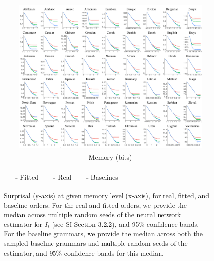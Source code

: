 \begin{figure}
	\begin{tabular}{lc}
	\rotatebox{90}{\ \ \ \ \ \ \ \ \ \ \ \ \ \ \ \ \ \ \ \ \ \ \ \ \ \ \ \ Surprisal (bits)} &
\includegraphics[width=0.95\textwidth]{results-table-mle.pdf}
\\
		&	Memory (bits)
	\end{tabular}

\begin{center}
\begin{tabular}{llll}
\textbf{\textcolor{fitted}{----}} Fitted&
\textbf{\textcolor{real}{----}} Real&
\textbf{\textcolor{baseline}{----}} Baselines&
\end{tabular}
\end{center}
	\caption{Surprisal (y-axis) at given memory level (x-axis), for real, fitted, and baseline orders.
	For the real and fitted orders, we provide the median across multiple random seeds of the neural network estimator for $I_t$ (see SI Section 3.2.2), and 95\% confidence bands.
	For the baseline grammars, we provide the median across both the sampled baseline grammars and multiple random seeds of the estimator, and 95\% confidence bands for this median.
}\label{fig:median-table-expt2}
\end{figure}


